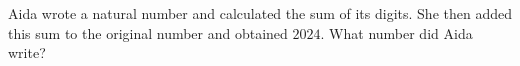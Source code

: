 Aida wrote a natural number and calculated the sum of its digits. She then added this sum to the original number and obtained $2024$. What number did Aida write?
